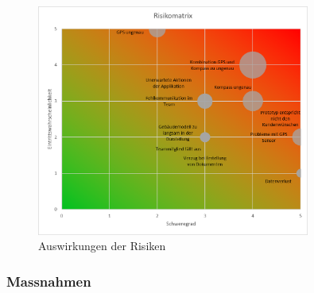 \documentclass[a4paper]{scrreprt}
\begin{document}
\begin{figure}[h!]
	\centering
	\includegraphics[keepaspectratio, width=0.8\textwidth]{RisikoMatrix}
	\caption{Auswirkungen der Risiken}
\end{figure}

\subsubsection{Massnahmen}
\end{document}
